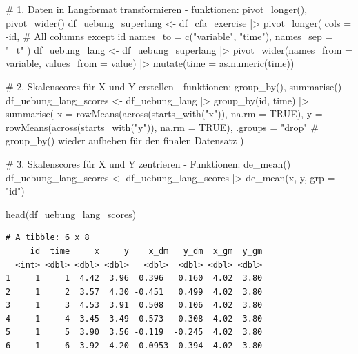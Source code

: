 \documentclass[
  letterpaper,
  DIV=11,
  numbers=noendperiod]{scrreprt}
\newenvironment{Shaded}{\begin{snugshade}}{\end{snugshade}}
\newcommand{\AttributeTok}[1]{\textcolor[rgb]{0.40,0.45,0.13}{#1}}
\newcommand{\CommentTok}[1]{\textcolor[rgb]{0.37,0.37,0.37}{#1}}
\newcommand{\ConstantTok}[1]{\textcolor[rgb]{0.56,0.35,0.01}{#1}}
\newcommand{\FunctionTok}[1]{\textcolor[rgb]{0.28,0.35,0.67}{#1}}
\newcommand{\NormalTok}[1]{\textcolor[rgb]{0.00,0.23,0.31}{#1}}
\newcommand{\OtherTok}[1]{\textcolor[rgb]{0.00,0.23,0.31}{#1}}
\newcommand{\SpecialCharTok}[1]{\textcolor[rgb]{0.37,0.37,0.37}{#1}}
\newcommand{\StringTok}[1]{\textcolor[rgb]{0.13,0.47,0.30}{#1}}
\begin{document}
\begin{tcolorbox}
\begin{Shaded}
\begin{Highlighting}[]
\CommentTok{\# 1. Daten in Langformat transformieren {-} funktionen: pivot\_longer(), pivot\_wider()}
\NormalTok{df\_uebung\_superlang }\OtherTok{\textless{}{-}}\NormalTok{ df\_cfa\_exercise }\SpecialCharTok{|\textgreater{}} 
  \FunctionTok{pivot\_longer}\NormalTok{(}
    \AttributeTok{cols =} \SpecialCharTok{{-}}\NormalTok{id, }\CommentTok{\# All columns except id}
    \AttributeTok{names\_to =} \FunctionTok{c}\NormalTok{(}\StringTok{"variable"}\NormalTok{, }\StringTok{"time"}\NormalTok{),}
    \AttributeTok{names\_sep =} \StringTok{"\_t"}
\NormalTok{  ) }
\NormalTok{df\_uebung\_lang }\OtherTok{\textless{}{-}}\NormalTok{ df\_uebung\_superlang }\SpecialCharTok{|\textgreater{}} 
  \FunctionTok{pivot\_wider}\NormalTok{(}\AttributeTok{names\_from =}\NormalTok{ variable,}
              \AttributeTok{values\_from =}\NormalTok{ value) }\SpecialCharTok{|\textgreater{}} 
  \FunctionTok{mutate}\NormalTok{(}\AttributeTok{time =} \FunctionTok{as.numeric}\NormalTok{(time)) }

\CommentTok{\# 2. Skalenscores für X und Y erstellen {-} funktionen: group\_by(), summarise()}
\NormalTok{df\_uebung\_lang\_scores }\OtherTok{\textless{}{-}}\NormalTok{ df\_uebung\_lang }\SpecialCharTok{|\textgreater{}} \FunctionTok{group\_by}\NormalTok{(id, time) }\SpecialCharTok{|\textgreater{}} 
  \FunctionTok{summarise}\NormalTok{(}
    \AttributeTok{x =} \FunctionTok{rowMeans}\NormalTok{(}\FunctionTok{across}\NormalTok{(}\FunctionTok{starts\_with}\NormalTok{(}\StringTok{"x"}\NormalTok{)), }\AttributeTok{na.rm =} \ConstantTok{TRUE}\NormalTok{),}
    \AttributeTok{y =} \FunctionTok{rowMeans}\NormalTok{(}\FunctionTok{across}\NormalTok{(}\FunctionTok{starts\_with}\NormalTok{(}\StringTok{"y"}\NormalTok{)), }\AttributeTok{na.rm =} \ConstantTok{TRUE}\NormalTok{),}
    \AttributeTok{.groups =} \StringTok{"drop"} \CommentTok{\# group\_by() wieder aufheben für den finalen Datensatz}
\NormalTok{  )}

\CommentTok{\# 3. Skalenscores für X und Y zentrieren {-} Funktionen: de\_mean()}
\NormalTok{df\_uebung\_lang\_scores }\OtherTok{\textless{}{-}}\NormalTok{ df\_uebung\_lang\_scores }\SpecialCharTok{|\textgreater{}} 
  \FunctionTok{de\_mean}\NormalTok{(x, y, }\AttributeTok{grp =} \StringTok{"id"}\NormalTok{)}


\FunctionTok{head}\NormalTok{(df\_uebung\_lang\_scores)}
\end{Highlighting}
\end{Shaded}

\begin{verbatim}
# A tibble: 6 x 8
     id  time     x     y    x_dm   y_dm  x_gm  y_gm
  <int> <dbl> <dbl> <dbl>   <dbl>  <dbl> <dbl> <dbl>
1     1     1  4.42  3.96  0.396   0.160  4.02  3.80
2     1     2  3.57  4.30 -0.451   0.499  4.02  3.80
3     1     3  4.53  3.91  0.508   0.106  4.02  3.80
4     1     4  3.45  3.49 -0.573  -0.308  4.02  3.80
5     1     5  3.90  3.56 -0.119  -0.245  4.02  3.80
6     1     6  3.92  4.20 -0.0953  0.394  4.02  3.80
\end{verbatim}

\end{tcolorbox}
\end{document}
